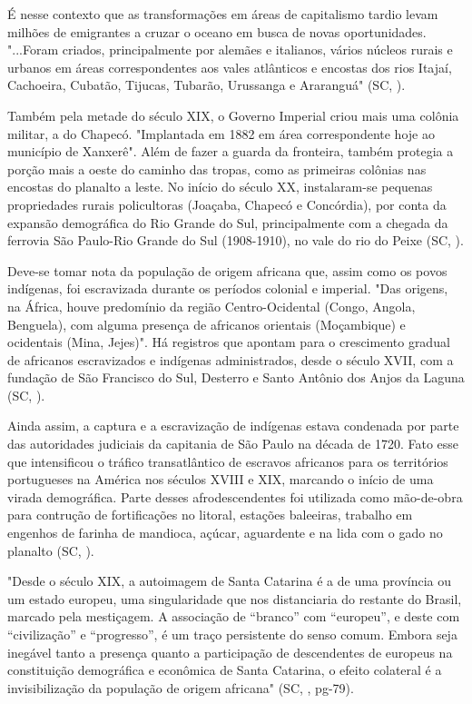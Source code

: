 \indent É nesse contexto que as transformações em áreas de capitalismo tardio levam milhões de emigrantes a cruzar o oceano em busca de novas oportunidades. "...Foram criados, principalmente por alemães e italianos, vários núcleos rurais e urbanos em áreas correspondentes aos vales atlânticos e encostas dos rios Itajaí, Cachoeira, Cubatão, Tijucas, Tubarão, Urussanga e Araranguá" (\acrlong{SC}, \citeyear{AtlasSCpopulacao}).

\indent Também pela metade do século XIX, o Governo Imperial criou mais uma colônia militar, a do Chapecó. "Implantada em 1882 em área correspondente hoje ao município de Xanxerê". Além de fazer a guarda da fronteira, também protegia a porção mais a oeste do caminho das tropas, como as primeiras colônias nas encostas do planalto a leste. No início do século XX, instalaram-se pequenas propriedades rurais policultoras (Joaçaba, Chapecó e Concórdia), por conta da expansão demográfica do Rio Grande do Sul, principalmente com a chegada da ferrovia São Paulo-Rio Grande do Sul (1908-1910), no vale do rio do Peixe (\acrlong{SC}, \citeyear{AtlasSCpopulacao}).

\indent Deve-se tomar nota da população de origem africana que, assim como os povos indígenas, foi escravizada durante os períodos colonial e imperial. "Das origens, na África, houve predomínio da região Centro-Ocidental (Congo, Angola, Benguela), com alguma presença de africanos orientais (Moçambique) e ocidentais (Mina, Jejes)". Há registros que apontam para o crescimento gradual de africanos escravizados e indígenas administrados, desde o século XVII, com a fundação de São Francisco do Sul, Desterro e Santo Antônio dos Anjos da Laguna (\acrlong{SC}, \citeyear{AtlasSCpopulacao}).

\indent Ainda assim, a captura e a escravização de indígenas estava condenada por parte das autoridades judiciais da capitania de São Paulo na década de 1720. Fato esse que intensificou o tráfico transatlântico de escravos africanos para os territórios portugueses na América nos séculos XVIII e XIX, marcando o início de uma virada demográfica. Parte desses afrodescendentes foi utilizada como mão-de-obra para contrução de fortificações no litoral, estações baleeiras, trabalho em engenhos de farinha de mandioca, açúcar, aguardente e na lida com o gado no planalto (\acrlong{SC}, \citeyear{AtlasSCpopulacao}). 

\begin{citacao}
"Desde o século XIX, a autoimagem de Santa Catarina é a de uma província ou um estado europeu, uma singularidade que nos distanciaria do restante do Brasil, marcado pela mestiçagem. A associação de “branco” com “europeu”, e deste com “civilização” e “progresso”, é um traço persistente do senso comum. Embora seja inegável tanto a presença quanto a participação de descendentes de europeus na constituição demográfica e econômica de Santa Catarina, o efeito colateral é a invisibilização da população de origem africana" (\acrlong{SC}, \citeyear{AtlasSCpopulacao}, pg-79).
\end{citacao}

